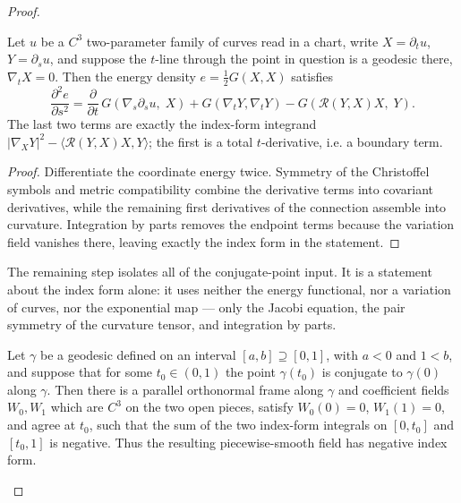 \begin{proof}
\begin{lemma}




Let $u$ be a $C^3$ two-parameter family of curves read in a chart, write
$X=\partial_t u$, $Y=\partial_s u$, and suppose the $t$-line through the point in
question is a geodesic there, $\nabla_tX=0$.  Then the energy density
$e=\tfrac12 G(X,X)$ satisfies
$$\frac{\partial^2 e}{\partial s^2}
=\frac{\partial}{\partial t}\,G\!\left(\nabla_s\partial_s u,\;X\right)
+G(\nabla_tY,\nabla_tY)-G\!\left({\mathcal R}(Y,X)X,\;Y\right).$$
The last two terms are exactly the index-form integrand $|\nabla_XY|^2-\langle
{\mathcal R}(Y,X)X,Y\rangle$; the first is a total $t$-derivative, i.e. a boundary
term.
\end{lemma}

\begin{proof}
\sketch
{}

Differentiate the coordinate energy twice. Symmetry of the Christoffel symbols and metric compatibility combine the derivative terms into covariant derivatives, while the remaining first derivatives of the connection assemble into curvature. Integration by parts removes the endpoint terms because the variation field vanishes there, leaving exactly the index form in the statement.
\end{proof}

The remaining step isolates all of the conjugate-point input.  It is a statement
about the index form alone: it uses neither the energy functional, nor a
variation of curves, nor the exponential map — only the Jacobi equation, the pair
symmetry of the curvature tensor, and integration by parts.

\begin{lemma}
\label{lem:index-form-negative-at-conjugate}





Let $\gamma$ be a geodesic defined on an interval $[a,b]\supseteq[0,1]$,
with $a<0$ and $1<b$, and suppose that for some $t_0\in(0,1)$ the point
$\gamma(t_0)$ is conjugate to $\gamma(0)$ along $\gamma$. Then there is a
parallel orthonormal frame along $\gamma$ and coefficient fields $W_0,W_1$
which are $C^3$ on the two open pieces, satisfy
$W_0(0)=0$, $W_1(1)=0$, and agree at $t_0$, such that the sum of the two
index-form integrals on $[0,t_0]$ and $[t_0,1]$ is negative. Thus the
resulting piecewise-smooth field has negative index form.
\end{lemma}


\end{proof}
